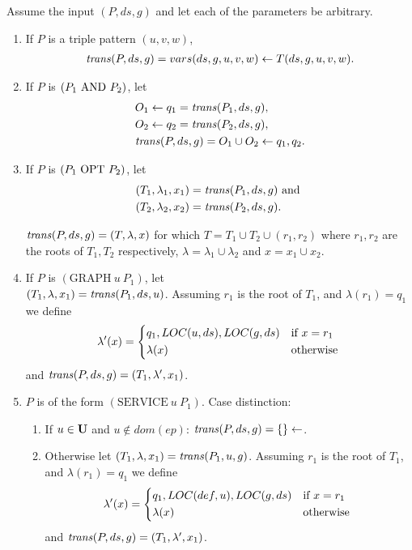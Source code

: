 \bigskip
\noindent
Assume the input $(P,ds,g)$ and let each of the parameters be
arbitrary. 
\begin{enumerate}
	\item If $P$ is a triple pattern $(u,v,w)$,  
		\begin{align*}
		\mathit{trans}(P,ds,g) = vars(ds,g,u,v,w) \leftarrow T(ds,g,u,v,w).\\	
		\end{align*}

	\item If $P$ is $(P_1  \mbox{ AND }  P_2)$, let
		\begin{align*}
			&O_1 \leftarrow q_1	= \mathit{trans}(P_1,ds,g),\\
			&O_2 \leftarrow q_2 = \mathit{trans}(P_2,ds,g), \\
			&\mathit{trans}(P,ds,g)		= O_1\cup O_2 \leftarrow q_1, q_2.
		\end{align*}
	\item If $P$ is $(P_1  \mbox{ OPT }  P_2)$, let\\
		\begin{align*}
			&(T_1, \lambda_1,x_1) = \mathit{trans}(P_1,ds,g)  \mbox{ and }\\
			&(T_2, \lambda_2, x_2) =  \mathit{trans}(P_2,ds,g).
		\end{align*}

		$\mathit{trans}(P,ds,g) = (T,\lambda,x)$ for which $T = T_1 \cup T_2 \cup (r_1,
		r_2)$ where $r_1,r_2$ are the roots of $T_1,T_2$ respectively,
		$\lambda = \lambda_1 \cup \lambda_2$ and $x = x_1 \cup x_2$.

	\item If $P$ is $(\mbox{GRAPH} \ u \ P_1)$, let\\
		$(T_1,\lambda,x_1) = \mathit{trans}(P_1,ds,u)$.	
		Assuming $r_1$ is the root of $T_1$,
		and $\lambda(r_1) = q_1$ we define \[ \lambda'(x) =\begin{dcases*} 
				q_1, LOC(u,ds),LOC(g,ds)& if $x = r_1$\\
				\lambda(x) & otherwise	\\
			\end{dcases*}
		\] and $\mathit{trans}(P,ds,g) = (T_1,\lambda',x_1)$.

	\item $P$ is of the form $(\mbox{SERVICE} \ u \ P_1)$. 
		Case distinction:
		\begin{enumerate}
			\item If $u \in \mathbf{U}$ and $u \notin dom(ep)$:
				$\mathit{trans}(P,ds,g) =  \{\}\leftarrow$.
			\item Otherwise let $(T_1,\lambda,x_1) = \mathit{trans}(P_1,u,g)$.
				Assuming $r_1$ is the root of $T_1$,
				and $\lambda(r_1) = q_1$ we define \[ \lambda'(x) =\begin{dcases*} 
				q_1, LOC(def,u),LOC(g,ds)& if $x = r_1$\\
				\lambda(x) & otherwise	\\
			\end{dcases*}
		\]  and $\mathit{trans}(P,ds,g) = (T_1,\lambda',x_1)$.
		\end{enumerate}


\end{enumerate}
